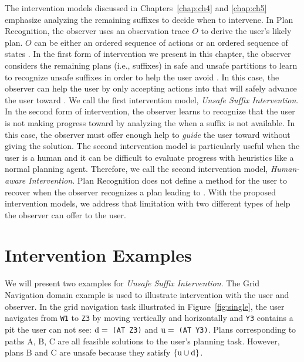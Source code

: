   
The intervention models discussed in Chapters~\ref{chap:ch4} and \ref{chap:ch5} emphasize analyzing the remaining suffixes to decide when to intervene.
In Plan Recognition, the observer uses an observation trace $O$ to derive the user's likely plan. $O$ can be either an ordered sequence of actions  \cite{ramirez2009plan,ramirez2010probabilistic} or an ordered sequence of states \cite{sohrabi2016plan}.
In the first form of intervention we present in this chapter, the observer considers the remaining plans (i.e., suffixes) in safe and unsafe partitions to learn to recognize unsafe suffixes in order to help the user avoid \undesired. 
In this case, the observer can help the user by only accepting actions into \historyDef that will safely advance the user toward \desired.
We call the first intervention model, \textit{Unsafe Suffix Intervention}.
In the second form of intervention, the observer learns to recognize that the user is not making progress toward \desired by analyzing the \historyDef when a suffix is not available. In this case,  the observer must offer enough help to \textit{guide} the user toward \desired without giving the solution. 
The second intervention model is particularly useful when the user is a human and it can be difficult to evaluate progress with heuristics like a normal planning agent.
Therefore, we call the second intervention model, \textit{Human-aware Intervention}.
Plan Recognition does not define a method for the user to recover when the observer recognizes a plan leading to \undesired. 
With the proposed intervention models, we address that limitation with two different types of help the observer can offer to the user.

\section{Intervention Examples}

We will present two examples for \textit{Unsafe Suffix Intervention}.
The Grid Navigation domain example is used to illustrate intervention with the user and observer. 
In the grid navigation task illustrated in Figure~\ref{fig:single}, the user navigates from \texttt{W1} to \texttt{Z3} by moving vertically and horizontally and \texttt{Y3} contains a pit the user can not see: \mbox{$\mathrm{d}=$ \texttt{(AT Z3)}} and \mbox{$\mathrm{u}=$ \texttt{(AT Y3)}}. 
Plans corresponding to paths A, B, C are all feasible solutions to the user's planning task. 
However, plans B and C are unsafe because they satisfy $\lbrace\mathrm{u}\cup\mathrm{d}\rbrace$. 

